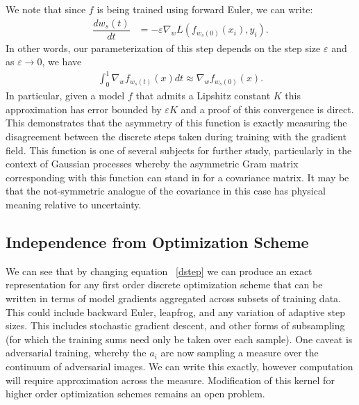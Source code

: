 We note that since $f$ is being trained using forward Euler, we can write:
\begin{align}
    \dfrac{d w_s(t)}{dt} &= -\varepsilon \nabla_w L(f_{w_s(0)}(x_i), y_i). \label{dstep}%
\end{align}
In other words, our parameterization of this step depends on the step size $\varepsilon$ and as $\varepsilon \to 0$, we have 
\begin{align}
    \int_0^1 \nabla_w f_{w_{s}(t)}(x)dt \approx \nabla_w f_{w_s(0)}(x).
\end{align}
In particular, given a model $f$ that admits a Lipshitz constant $K$ this approximation has error bounded by $\varepsilon K$ and a proof of this convergence is direct. 
This demonstrates that the asymmetry of this function is exactly measuring the disagreement between the discrete steps taken during training with the gradient field. 
This function is one of several subjects for further study, particularly in the context of Gaussian processes whereby the asymmetric Gram matrix corresponding with this function can stand in for a covariance matrix. It may be that the not-symmetric analogue of the covariance in this case has physical meaning relative to uncertainty.

\subsection{Independence from Optimization Scheme}
We can see that by changing equation ~\ref{dstep} we can produce an exact representation for any first order discrete optimization scheme that can be written in terms of model gradients aggregated across subsets of training data. This could include backward Euler, leapfrog, and any variation of adaptive step sizes. This includes stochastic gradient descent, and other forms of subsampling (for which the training sums need only be taken over each sample). One caveat is adversarial training, whereby the $a_i$ are now sampling a measure over the continuum of adversarial images. We can write this exactly, however computation will require approximation across the measure. Modification of this kernel for higher order optimization schemes remains an open problem.


